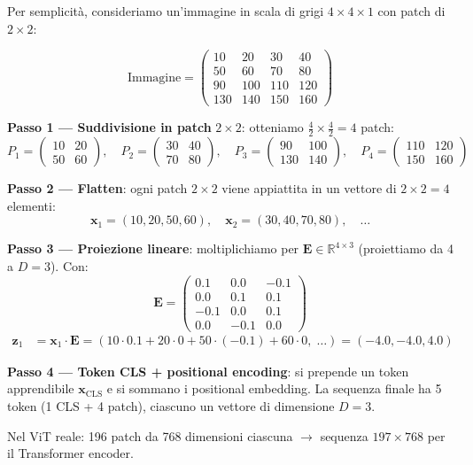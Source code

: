 \documentclass[12pt,a4paper]{article}
\begin{document}
\begin{examplebox}
Per semplicit\`a, consideriamo un'immagine in scala di grigi $4 \times 4 \times 1$ con patch di $2 \times 2$:

\[
\text{Immagine} = \begin{pmatrix}
10 & 20 & 30 & 40 \\
50 & 60 & 70 & 80 \\
90 & 100 & 110 & 120 \\
130 & 140 & 150 & 160
\end{pmatrix}
\]

\textbf{Passo 1 --- Suddivisione in patch} $2 \times 2$: otteniamo $\frac{4}{2} \times \frac{4}{2} = 4$ patch:
\[
P_1 = \begin{pmatrix} 10 & 20 \\ 50 & 60 \end{pmatrix}, \quad
P_2 = \begin{pmatrix} 30 & 40 \\ 70 & 80 \end{pmatrix}, \quad
P_3 = \begin{pmatrix} 90 & 100 \\ 130 & 140 \end{pmatrix}, \quad
P_4 = \begin{pmatrix} 110 & 120 \\ 150 & 160 \end{pmatrix}
\]

\textbf{Passo 2 --- Flatten}: ogni patch $2 \times 2$ viene appiattita in un vettore di $2 \times 2 = 4$ elementi:
\[
\mathbf{x}_1 = (10, 20, 50, 60), \quad \mathbf{x}_2 = (30, 40, 70, 80), \quad \ldots
\]

\textbf{Passo 3 --- Proiezione lineare}: moltiplichiamo per $\mathbf{E} \in \mathbb{R}^{4 \times 3}$ (proiettiamo da 4 a $D = 3$). Con:
\[
\mathbf{E} = \begin{pmatrix} 0.1 & 0.0 & -0.1 \\ 0.0 & 0.1 & 0.1 \\ -0.1 & 0.0 & 0.1 \\ 0.0 & -0.1 & 0.0 \end{pmatrix}
\]
\begin{align*}
    \mathbf{z}_1 &= \mathbf{x}_1 \cdot \mathbf{E} = (10 \cdot 0.1 + 20 \cdot 0 + 50 \cdot (-0.1) + 60 \cdot 0, \;\ldots) = (-4.0, -4.0, 4.0)
\end{align*}

\textbf{Passo 4 --- Token CLS + positional encoding}: si prepende un token apprendibile $\mathbf{x}_{\text{CLS}}$ e si sommano i positional embedding. La sequenza finale ha 5 token (1 CLS + 4 patch), ciascuno un vettore di dimensione $D = 3$.

Nel ViT reale: 196 patch da 768 dimensioni ciascuna $\to$ sequenza $197 \times 768$ per il Transformer encoder.
\end{examplebox}
\end{document}
